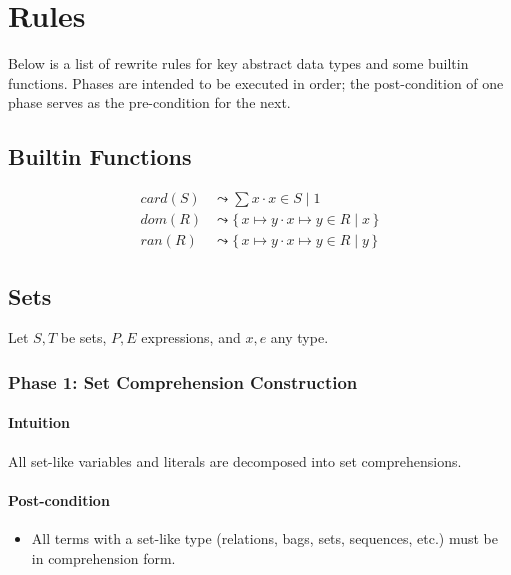 \documentclass{article}
\newcommand{\bSet}[3]{%
  \{\, #1 \cdot #2 \mid #3 \, \}%
}
\begin{document}
\section{Rules}
Below is a list of rewrite rules for key abstract data types and some builtin functions. Phases are intended to be executed in order; the post-condition of one phase serves as the pre-condition for the next.
\subsection{Builtin Functions}

\noindent\begin{minipage}{\linewidth}
\begin{align}
  \tag{Cardinality}
  card(S)
  &\leadsto
  \sum x \cdot x \in S \mid 1
  \\
  \tag{Domain}
  dom(R)
  &\leadsto
  \bSet{x \mapsto y}{x \mapsto y \in R}{x}
  \\
  \tag{Range}
  ran(R)
  &\leadsto
  \bSet{x \mapsto y}{x \mapsto y \in R}{y}
\end{align}
\end{minipage}
\subsection{Sets}

Let $S,T$ be sets, $P, E$ expressions, and $x, e$ any type.
\subsubsection{Phase 1: Set Comprehension Construction}

\paragraph{Intuition} All set-like variables and literals are decomposed into set comprehensions.

\paragraph{Post-condition}
\begin{itemize}
  \item All terms with a set-like type (relations, bags, sets, sequences, etc.) must be in comprehension form.
\end{itemize}
\end{document}
